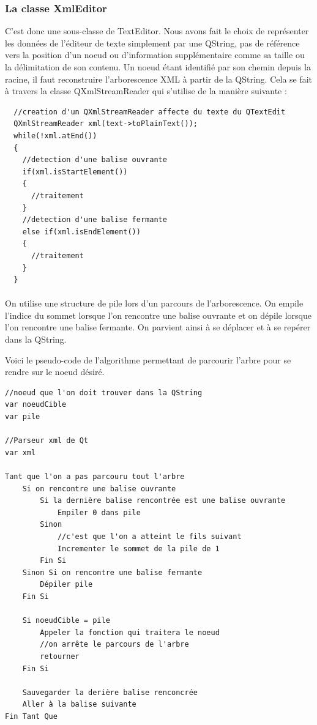 \subsubsection{La classe XmlEditor}

C'est donc une sous-classe de TextEditor. Nous avons fait le choix de représenter les données de l'éditeur de texte simplement par une QString, pas de référence vers la position d'un noeud ou d'information supplémentaire comme sa taille ou la délimitation de son contenu.
Un noeud étant identifié par son chemin depuis la racine, il faut reconstruire l'arborescence XML à partir de la QString. Cela se fait à travers la classe QXmlStreamReader qui s'utilise de la manière suivante :
\begin{lstlisting}
  //creation d'un QXmlStreamReader affecte du texte du QTextEdit
  QXmlStreamReader xml(text->toPlainText());
  while(!xml.atEnd())
  {
    //detection d'une balise ouvrante
    if(xml.isStartElement())
    {
      //traitement
    }
    //detection d'une balise fermante
    else if(xml.isEndElement())
    {
      //traitement
    }
  }
\end{lstlisting}
\paragraph{}
On utilise une structure de pile lors d'un parcours de l'arborescence. On empile l'indice du sommet lorsque l'on rencontre une balise ouvrante et on dépile lorsque l'on rencontre une balise fermante.
On parvient ainsi à se déplacer et à se repérer dans la QString.

Voici le pseudo-code de l'algorithme permettant de parcourir l'arbre pour se rendre sur le noeud désiré.

\begin{verbatim}
//noeud que l'on doit trouver dans la QString
var noeudCible
var pile

//Parseur xml de Qt
var xml

Tant que l'on a pas parcouru tout l'arbre
    Si on rencontre une balise ouvrante
        Si la dernière balise rencontrée est une balise ouvrante
            Empiler 0 dans pile
        Sinon
            //c'est que l'on a atteint le fils suivant
            Incrementer le sommet de la pile de 1
        Fin Si
    Sinon Si on rencontre une balise fermante
        Dépiler pile
    Fin Si
    
    Si noeudCible = pile
        Appeler la fonction qui traitera le noeud
        //on arrête le parcours de l'arbre
        retourner
    Fin Si
   
    Sauvegarder la derière balise renconcrée
    Aller à la balise suivante
Fin Tant Que
\end{verbatim}

